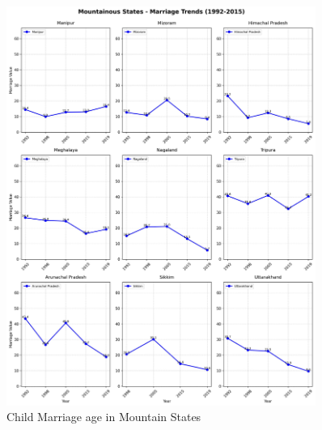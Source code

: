 \begin{figure}[H]
    \centering
    \includegraphics[width=0.9\textwidth, bb=0 0 800 800, clip]{figures/nfhs/mountainous_states_marriage_subplots.jpeg}
    \caption{Child Marriage age in Mountain States}
    \label{fig:nfhs_mountain_marriage}
\end{figure}